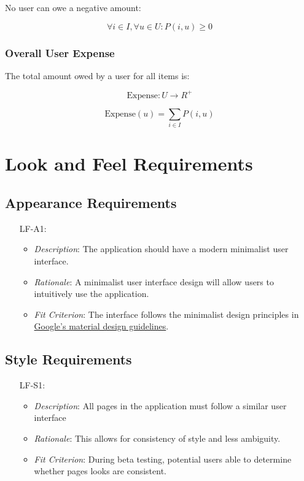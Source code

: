 \documentclass[12pt]{article}
\begin{document}
No user can owe a negative amount:

\[
\forall i \in I, \forall u \in U: P(i, u) \geq 0
\]

\subsubsection*{Overall User Expense}

The total amount owed by a user for all items is:

\[
\text{Expense}: U \rightarrow R^+
\]

\[
\text{Expense}(u) = \sum_{i \in I} P(i, u)
\]


\section{Look and Feel Requirements}
\subsection{Appearance Requirements}
\noindent \begin{itemize}
    \item[LF-A1:] 
    \begin{itemize}
        \item \textit{Description}: The application should have a modern minimalist user interface.
        \item \textit{Rationale}: A minimalist user interface design will allow users to intuitively use the application.
        \item \textit{Fit Criterion}: The interface follows the minimalist design principles in \href{https://m3.material.io/foundations}{Google's material design guidelines}. 
    \end{itemize}
\end{itemize}

\subsection{Style Requirements}


\noindent \begin{itemize}
    \item[LF-S1:] 
    \begin{itemize}
        \item \textit{Description}: All pages in the application must follow a similar user interface
        \item \textit{Rationale}: This allows for consistency of style and less ambiguity.
        \item \textit{Fit Criterion}: During beta testing, potential users able to determine whether pages looks are consistent.
    \end{itemize}
\end{itemize}
\end{document}
